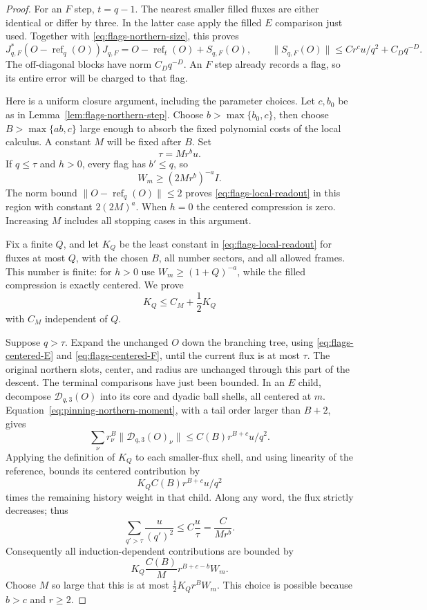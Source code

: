 \begin{proof}
For an $F$ step, $t=q-1$.  The nearest smaller filled fluxes are either
identical or differ by three.  In the latter case apply the filled
$E$ comparison just used.  Together with
\eqref{eq:flags-northern-size}, this proves
\begin{equation}
 J_{q,F}^*(O-\operatorname{ref}_q(O))J_{q,F}
 =O-\operatorname{ref}_t(O)+S_{q,F}(O),\qquad
 \|S_{q,F}(O)\|\leq Cr^cu/q^2+C_Dq^{-D}.
 \label{eq:flags-centered-F}
\end{equation}
The off-diagonal blocks have norm $C_Dq^{-D}$.  An $F$ step already
records a flag, so its entire error will be charged to that flag.

Here is a uniform closure argument, including the parameter choices.
Let $c,b_0$ be as in Lemma~\ref{lem:flags-northern-step}.  Choose
$b>\max\{b_0,c\}$, then choose $B>\max\{ab,c\}$ large enough to
absorb the fixed polynomial costs of the local calculus.  A constant
$M$ will be fixed after $B$.  Set
\[
 \tau=Mr^b u.
\]
If $q\leq\tau$ and $h>0$, every flag has $b'\leq q$, so
\[
 W_m\geq(2Mr^b)^{-a}I.
\]
The norm bound $\|O-\operatorname{ref}_q(O)\|\leq2$ proves
\eqref{eq:flags-local-readout} in this region with constant
$2(2M)^a$.  When $h=0$ the centered compression is zero.  Increasing
$M$ includes all stopping cases in this argument.

Fix a finite $Q$, and let $K_Q$ be the least constant in
\eqref{eq:flags-local-readout} for fluxes at most $Q$, with the
chosen $B$, all number sectors, and all allowed frames.  This number
is finite: for $h>0$ use $W_m\geq(1+Q)^{-a}$, while the filled
compression is exactly centered.  We prove
\begin{equation}
 K_Q\leq C_M+\frac12K_Q
 \label{eq:flags-bootstrap-constant}
\end{equation}
with $C_M$ independent of $Q$.

Suppose $q>\tau$.  Expand the unchanged $O$ down the branching tree,
using \eqref{eq:flags-centered-E} and
\eqref{eq:flags-centered-F}, until the current flux is at most
$\tau$.  The original northern slots, center, and radius are unchanged
through this part of the descent.  The terminal comparisons have just
been bounded.  In an $E$ child, decompose
$\mathcal D_{q,3}(O)$ into its core and dyadic ball shells, all centered
at $m$.  Equation~\eqref{eq:pinning-northern-moment}, with a tail order
larger than $B+2$, gives
\[
 \sum_\nu r_\nu^B\|\mathcal D_{q,3}(O)_\nu\|
 \leq C(B)r^{B+c}u/q^2.
\]
Applying the definition of $K_Q$ to each smaller-flux shell, and using
linearity of the reference, bounds its centered contribution by
\[
 K_QC(B)r^{B+c}u/q^2
\]
times the remaining history weight in that child.  Along any word,
the flux strictly decreases; thus
\[
 \sum_{q'>\tau}\frac{u}{(q')^2}\leq C\frac{u}{\tau}
       =\frac{C}{Mr^b}.
\]
Consequently all induction-dependent contributions are bounded by
\[
 K_Q\frac{C(B)}M r^{B+c-b}W_m.
\]
Choose $M$ so large that this is at most
$\tfrac12 K_Qr^BW_m$.  This choice is possible because $b>c$ and
$r\geq2$.


\end{proof}
